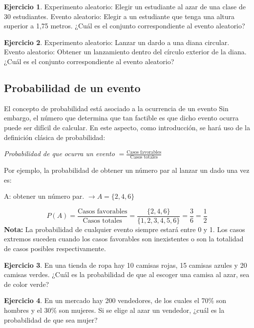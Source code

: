 \documentclass[
]{book}
\theoremstyle{definition}
\theoremstyle{definition}
\theoremstyle{definition}
\newtheorem{exercise}{Ejercicio}[chapter]
\theoremstyle{definition}
\theoremstyle{remark}
\begin{document}
\begin{exercise}
Experimento aleatorio: Elegir un estudiante al azar de una clase de 30 estudiantes. Evento aleatorio: Elegir a un estudiante que tenga una altura superior a 1,75 metros. ¿Cuál es el conjunto correspondiente al evento aleatorio?
\end{exercise}

\begin{exercise}
Experimento aleatorio: Lanzar un dardo a una diana circular. Evento aleatorio: Obtener un lanzamiento dentro del círculo exterior de la diana. ¿Cuál es el conjunto correspondiente al evento aleatorio?
\end{exercise}

\hypertarget{probabilidad-evento}{%
\subsection{Probabilidad de un evento}\label{probabilidad-evento}}

El concepto de probabilidad está asociado a la ocurrencia de un evento Sin embargo, el número que determina que tan factible es que dicho evento ocurra puede ser difícil de calcular. En este aspecto, como introducción, se hará uso de la definición clásica de probabilidad:

\emph{Probabilidad de que ocurra un evento} \(= \displaystyle\frac{\text{Casos favorables}}{\text{Casos totales}}\)

Por ejemplo, la probabilidad de obtener un número par al lanzar un dado una vez es:

A: obtener un número par. \(\rightarrow A = \lbrace 2,4,6 \rbrace\)

\[P(A) = \frac{\text{Casos favorables}}{\text{Casos totales}} = \frac{\lbrace 2,4,6 \rbrace}{\lbrace 1,2,3,4,5,6 \rbrace} = \frac{3}{6}= \frac{1}{2}\]
\textbf{Nota:} La probabilidad de cualquier evento siempre estará entre 0 y 1. Los casos extremos suceden cuando los casos favorables son inexistentes o son la totalidad de casos posibles respectivamente.

\begin{exercise}
En una tienda de ropa hay 10 camisas rojas, 15 camisas azules y 20 camisas verdes. ¿Cuál es la probabilidad de que al escoger una camisa al azar, sea de color verde?
\end{exercise}

\begin{exercise}
En un mercado hay 200 vendedores, de los cuales el 70\% son hombres y el 30\% son mujeres. Si se elige al azar un vendedor, ¿cuál es la probabilidad de que sea mujer?
\end{exercise}
\end{document}
